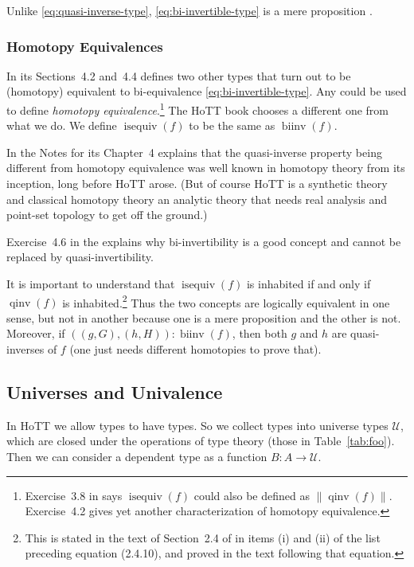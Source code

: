 \documentclass[11pt]{article}
\DeclareMathOperator{\qinv}{qinv}
\DeclareMathOperator{\binv}{biinv}
\DeclareMathOperator{\isEquiv}{isequiv}
\newcommand{\proptrunc}[1]{\lVert #1 \rVert}
\newcommand{\universe}{\mathcal{U}}
\begin{document}
Unlike \eqref{eq:quasi-inverse-type}, \eqref{eq:bi-invertible-type} is
a mere proposition .

\subsubsection{Homotopy Equivalences}

In its Sections~4.2 and~4.4 
defines two other types that turn out to be (homotopy)
equivalent to bi-equivalence \eqref{eq:bi-invertible-type}.
Any could be used to define
\emph{homotopy equivalence}.\footnote{Exercise~3.8 {in} 
says $\isEquiv(f)$ could also be defined as $\proptrunc{\qinv(f)}$.
Exercise~4.2 gives yet another characterization of homotopy equivalence.}
The HoTT book chooses a different one from what we do.
We define $\isEquiv(f)$ to be the same as $\binv(f)$.

In the Notes for its Chapter~4  explains that
the quasi-inverse property being different from homotopy
equivalence was well known in homotopy theory from its inception, long
before HoTT arose.  (But of course HoTT is a synthetic theory and classical
homotopy theory an analytic theory that needs real analysis and point-set
topology to get off the ground.)

Exercise~4.6 {in} the  explains why
bi-invertibility is a good concept and cannot be replaced
by quasi-invertibility.

It is important to understand that $\isEquiv(f)$ is inhabited if and
only if $\qinv(f)$ is inhabited.\footnote{This is stated in the text
of Section~2.4 of  in items (i) and (ii) of the
list preceding equation (2.4.10), and proved in the text following that
equation.}  Thus the two concepts are logically equivalent in one sense,
but not in another because one is a mere proposition and the other is not.
Moreover, if $((g, G), (h, H)) : \binv(f)$, then both $g$ and $h$
are quasi-inverses of $f$ (one just needs different homotopies to prove that).


\subsection{Universes and Univalence}
\label{sec:univalence}

In HoTT we allow types to have types.
So we collect types into universe types $\universe$,
which are closed under the operations of type theory
(those in Table~\ref{tab:foo}).
Then we can consider a dependent type as a function $B : A \to \universe$.
\end{document}
